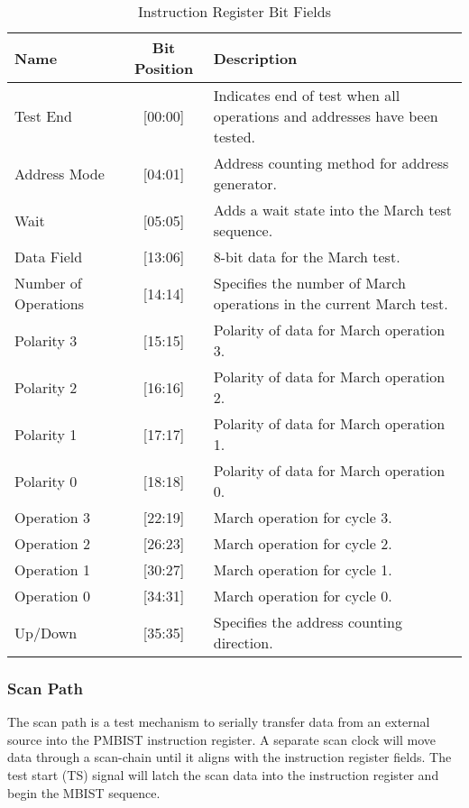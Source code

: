 \begin{table}[H]
  \caption{Instruction Register Bit Fields}
  \centering
  \begin{tabular}{|p{1in}|c|p{3in}|}
  \hline
  Name & Bit Position & Description \\
  \hline\hline
  Test End & [00:00] & Indicates end of test when all operations and addresses have been tested. \\ \hline
  Address Mode & [04:01] & Address counting method for address generator. \\ \hline
  Wait & [05:05] & Adds a wait state into the March test sequence. \\ \hline
  Data Field & [13:06] & 8-bit data for the March test. \\ \hline
  Number of Operations & [14:14] & Specifies the number of March operations in the current March test. \\ \hline
  Polarity 3 & [15:15] & Polarity of data for March operation 3. \\ \hline
  Polarity 2 & [16:16] & Polarity of data for March operation 2. \\ \hline
  Polarity 1 & [17:17] & Polarity of data for March operation 1. \\ \hline
  Polarity 0 & [18:18] & Polarity of data for March operation 0. \\ \hline
  Operation 3 & [22:19] & March operation for cycle 3. \\ \hline
  Operation 2 & [26:23] & March operation for cycle 2. \\ \hline
  Operation 1 & [30:27] & March operation for cycle 1. \\ \hline
  Operation 0 & [34:31] & March operation for cycle 0. \\ \hline
  Up/Down & [35:35] & Specifies the address counting direction. \\ \hline
  \end{tabular}
  \label{tab:instreg}
\end{table}

\subsubsection{Scan Path} 
The scan path is a test mechanism to serially transfer data from an external source into the PMBIST instruction register.  A separate scan clock will move data through a scan-chain until it aligns with the instruction register fields.  The test start (TS) signal will latch the scan data into the instruction register and begin the MBIST sequence.
